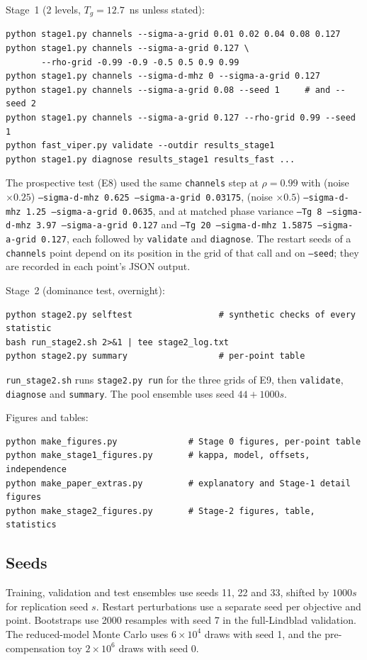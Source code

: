 \documentclass[aps,pra,onecolumn,notitlepage,superscriptaddress,nofootinbib,floatfix]{revtex4-2}
\begin{document}
Stage~1 (2 levels, $T_g=12.7$~ns unless stated):
\begin{verbatim}
python stage1.py channels --sigma-a-grid 0.01 0.02 0.04 0.08 0.127
python stage1.py channels --sigma-a-grid 0.127 \
       --rho-grid -0.99 -0.9 -0.5 0.5 0.9 0.99
python stage1.py channels --sigma-d-mhz 0 --sigma-a-grid 0.127
python stage1.py channels --sigma-a-grid 0.08 --seed 1     # and --seed 2
python stage1.py channels --sigma-a-grid 0.127 --rho-grid 0.99 --seed 1
python fast_viper.py validate --outdir results_stage1
python stage1.py diagnose results_stage1 results_fast ...
\end{verbatim}
\sloppy
The prospective test (E8) used the same \texttt{channels} step at
$\rho=0.99$ with (noise $\times0.25$)
\texttt{--sigma-d-mhz 0.625
--sigma-a-grid 0.03175}, (noise $\times0.5$) \texttt{--sigma-d-mhz 1.25
--sigma-a-grid 0.0635}, and at matched phase variance
\texttt{--Tg 8 --sigma-d-mhz 3.97 --sigma-a-grid 0.127} and
\texttt{--Tg 20 --sigma-d-mhz 1.5875 --sigma-a-grid 0.127}, each followed by
\texttt{validate} and \texttt{diagnose}. The restart seeds of a
\texttt{channels} point depend on its position in the grid of that call and on
\texttt{--seed}; they are recorded in each point's JSON output.

Stage~2 (dominance test, overnight):
\begin{verbatim}
python stage2.py selftest                 # synthetic checks of every statistic
bash run_stage2.sh 2>&1 | tee stage2_log.txt
python stage2.py summary                  # per-point table
\end{verbatim}
\texttt{run\_stage2.sh} runs \texttt{stage2.py run} for the three grids of
E9, then \texttt{validate}, \texttt{diagnose} and \texttt{summary}. The pool
ensemble uses seed $44+1000s$.

Figures and tables:
\begin{verbatim}
python make_figures.py              # Stage 0 figures, per-point table
python make_stage1_figures.py       # kappa, model, offsets, independence
python make_paper_extras.py         # explanatory and Stage-1 detail figures
python make_stage2_figures.py       # Stage-2 figures, table, statistics
\end{verbatim}

\subsection{Seeds}

Training, validation and test ensembles use seeds 11, 22 and 33, shifted by
$1000s$ for replication seed $s$. Restart perturbations use a separate seed
per objective and point. Bootstraps use 2000 resamples with seed 7 in the
full-Lindblad validation. The reduced-model Monte Carlo uses $6\times10^4$
draws with seed 1, and the pre-compensation toy $2\times10^6$ draws with
seed 0.
\end{document}

